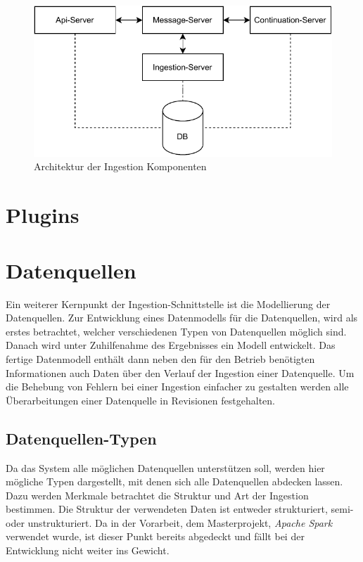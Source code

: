 \begin{figure}
  \centering
  \includegraphics{Grafiken/ingestion-arch.pdf}
  \caption{Architektur der Ingestion Komponenten}
  \label{fig:ingestion_arch}
\end{figure}

\section{Plugins}


\section{Datenquellen}
Ein weiterer Kernpunkt der Ingestion-Schnittstelle ist die Modellierung der Datenquellen.
Zur Entwicklung eines Datenmodells für die Datenquellen, wird als erstes betrachtet, welcher verschiedenen Typen von Datenquellen möglich sind.
Danach wird unter Zuhilfenahme des Ergebnisses ein Modell entwickelt.
Das fertige Datenmodell enthält dann neben den für den Betrieb benötigten Informationen auch Daten über den Verlauf der Ingestion einer Datenquelle.
Um die Behebung von Fehlern bei einer Ingestion einfacher zu gestalten werden alle Überarbeitungen einer Datenquelle in Revisionen festgehalten.

\subsection{Datenquellen-Typen}
\label{sec:datasource-types}

Da das System alle möglichen Datenquellen unterstützen soll, werden hier mögliche Typen dargestellt, mit denen sich alle Datenquellen abdecken lassen.
Dazu werden Merkmale betrachtet die Struktur und Art der Ingestion bestimmen.
Die Struktur der verwendeten Daten ist entweder strukturiert, semi- oder unstrukturiert.
Da in der Vorarbeit, dem Masterprojekt, \textit{Apache Spark} verwendet wurde, ist dieser Punkt bereits abgedeckt und fällt bei der Entwicklung nicht weiter ins Gewicht.

